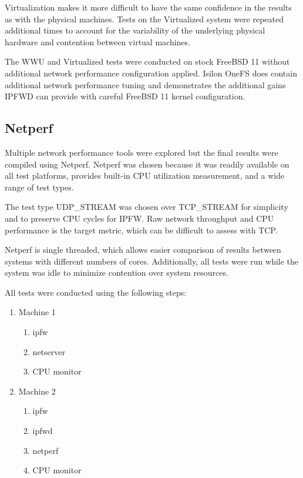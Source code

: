 \documentclass[journal]{IEEEtran}
\begin{document}
Virtualization makes it more difficult to have the same confidence in the
results as with the physical machines. Tests on the Virtualized system were
repeated additional times to account for the variability of the underlying
physical hardware and contention between virtual machines.

The WWU and Virtualized tests were conducted on stock FreeBSD 11 without
additional network performance configuration applied. Isilon OneFS does contain
additional network performance tuning and demonstrates the additional gains
IPFWD can provide with careful FreeBSD 11 kernel configuration.


  \subsection{Netperf}
  Multiple network performance tools were explored but the final results were
  compiled using Netperf. Netperf was chosen because it was readily available
  on all test platforms, provides built-in CPU utilization measurement, and a
  wide range of test types.

  The test type UDP\_STREAM was chosen over TCP\_STREAM for simplicity and to
  preserve CPU cycles for IPFW. Raw network throughput and CPU performance is
  the target metric, which can be difficult to assess with TCP.

  Netperf is single threaded, which allows easier comparison of results between
  systems with different numbers of cores. Additionally, all tests were run
  while the system was idle to minimize contention over system resources. 

  All tests were conducted using the following steps:
  \begin{enumerate}
      \item Machine 1
      \begin{enumerate}
          \item ipfw
          \item netserver
          \item CPU monitor
      \end{enumerate}
      \item Machine 2
      \begin{enumerate}
          \item ipfw
          \item ipfwd
          \item netperf
          \item CPU monitor
      \end{enumerate}
  \end{enumerate}
\end{document}
